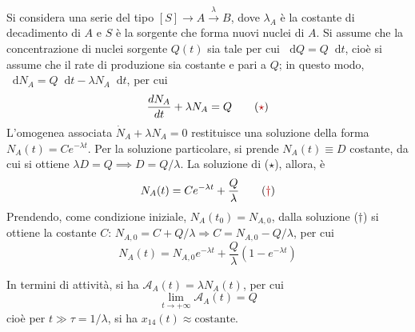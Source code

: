 \documentclass[11pt, a4paper]{scrartcl}
\theoremstyle{style}
\newcommand{\dd}{\mathop{}\!\mathrm{d}}
\numberwithin{equation}{subsection}
\begin{document}
Si considera una serie del tipo $\left[ S \right]  \to  A \xrightarrow{\ \, \lambda \, \ } B$, dove $\lambda_A $ \`e la costante di decadimento di $A$ e $S$ \`e la sorgente che forma nuovi nuclei di $A$.
Si assume che la concentrazione di nuclei sorgente $Q(t)$ sia tale per cui $\dd Q = Q\dd t$, cio\`e si assume che il rate di produzione sia costante e pari a $Q$; in questo modo, $\dd N_A = Q \dd t - \lambda  N_A \dd t$, per cui 
\begin{equation}
	\frac{d N_A}{d t}  + \lambda  N_A = Q
	\tag{{\color{red!70!black}$\star$}}
\end{equation}
L'omogenea associata $\dot{N}_A + \lambda  N_A =0 $ restituisce una soluzione della forma $N_A(t) = C e^{-\lambda  t}$.
Per la soluzione particolare, si prende $N_A(t) \equiv D$ costante, da cui si ottiene $\lambda  D = Q \implies D  = Q / \lambda $.
La soluzione di ({\color{red!70!black}$\star$}), allora, \`e
\begin{equation}
	N_A(t) = C e ^{-\lambda t} + \frac{Q}{\lambda }
	\tag{{\color{red!70!black}$\dagger$}}
\end{equation}
Prendendo, come condizione iniziale, $N_A(t_0) = N_{A,0}$, dalla soluzione ({\color{red!70!black}$\dagger$}) si ottiene la costante $C$: $N_{A,0} = C + Q / \lambda \Rightarrow C = N_{A,0} - Q / \lambda $, per cui
\begin{equation}
	N_{A}(t) = N_{A,0} e^{-\lambda t} + \frac{Q}{\lambda } \left(1 - e^{-\lambda t}\right) 
\end{equation}
\begin{center}
\end{center}
In termini di attivit\`a, si ha $\mathcal{A} _A (t) = \lambda  N_A(t)$, per cui 
\[
\lim_{t \to +\infty} \mathcal{A} _A (t) = Q
\] 
cio\`e per $t \gg \tau  = 1 / \lambda $, si ha $x_{14}(t)\approx \text{costante}$.
\end{document}
